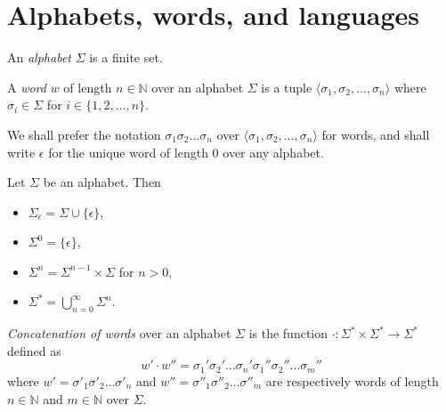 \section{Alphabets, words, and languages}

\begin{definition}
  An \emph{alphabet} $\Sigma$ is a finite set.
\end{definition}

\begin{definition}
  A \emph{word} $w$ of length $n \in \mathbb{N}$ over an alphabet $\Sigma$ is a tuple
  $\langle \sigma_1, \sigma_2, \ldots, \sigma_n \rangle$ where $\sigma_i \in \Sigma$
  for $i \in \{ 1, 2, \ldots, n \}$.
\end{definition}

We shall prefer the notation $\sigma_1 \sigma_2 \ldots \sigma_n$ over $\langle
\sigma_1, \sigma_2, \ldots, \sigma_n \rangle$ for words, and shall write $\epsilon$
for the unique word of length $0$ over any alphabet.

\begin{definition}
  Let $\Sigma$ be an alphabet. Then
  \begin{itemize}
    \item $\Sigma_\epsilon = \Sigma \cup \{ \epsilon \}$,
    \item $\Sigma^0 = \{ \epsilon \}$,
    \item $\Sigma^n = \Sigma^{n-1} \times \Sigma$ for $n > 0$,
    \item $\Sigma^* = \bigcup_{n = 0}^{\infty} \Sigma^n$.
  \end{itemize}
\end{definition}

\begin{definition}
  \emph{Concatenation of words} over an alphabet $\Sigma$ is the function $\cdot :
  \Sigma^* \times \Sigma^* \rightarrow \Sigma^*$ defined as
  \begin{equation*}
    w' \cdot w'' = \sigma_1' \sigma_2' \ldots \sigma_n' \sigma_1'' \sigma_2'' \ldots
    \sigma_m''
  \end{equation*}
  where $w' = \sigma'_1 \sigma'_2 \ldots \sigma'_n$ and $w'' = \sigma''_1 \sigma''_2
  \ldots \sigma''_m$ are respectively words of length $n \in \mathbb{N}$ and $m \in
  \mathbb{N}$ over $\Sigma$.
\end{definition}

